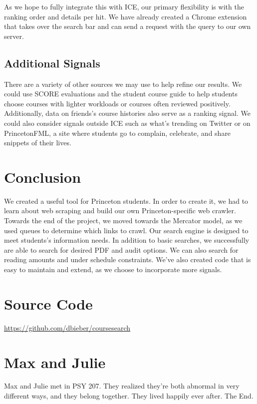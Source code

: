 \documentclass[12pt,letterpaper]{article}
\begin{document}
As we hope to fully integrate this with ICE, our primary flexibility is with the ranking order and details per hit. We have already created a Chrome extension that takes over the search bar and can send a request with the query to our own server.

\subsection{Additional Signals}

There are a variety of other sources we may use to help refine our results. We could use SCORE evaluations and the student course guide to help students choose courses with lighter workloads or courses often reviewed positively. Additionally, data on friends's course histories also serve as a ranking signal. We could also consider signals outside ICE such as what's trending on Twitter or on PrincetonFML, a site where students go to complain, celebrate, and share snippets of their lives.

\section{Conclusion}

We created a useful tool for Princeton students. In order to create it, we had to learn about web scraping and build our own Princeton-specific web crawler. Towards the end of the project, we moved towards the Mercator model, as we used queues to determine which links to crawl.
Our search engine is designed to meet students's information needs. In addition to basic searches, we successfully are able to search for desired PDF and audit options. We can also search for reading amounts and under schedule constraints. We've also created code that is easy to maintain and extend, as we choose to incorporate more signals.


\appendix

\section{Source Code}
\url{https://github.com/dbieber/coursesearch}

\section{Max and Julie}
Max and Julie met in PSY 207. They realized they're both abnormal in very different ways, and they belong together. They lived happily ever after. The End.
\end{document}
